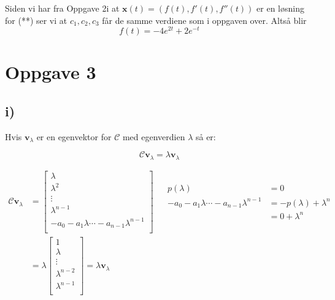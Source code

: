 \documentclass[a4paper, norsk, twoside, 10pt]{article}
\begin{document}
\begin{flushleft}
  Siden vi har fra Oppgave 2i at $\mathbf{x}(t)  = (f(t) , f'(t) , f''(t))$ er en løsning for (**) ser vi at $c_{1}, c_{2}, c_{3}$ får de samme verdiene som i oppgaven over. Altså blir
  \[f(t) = -4e^{2t} + 2e^{-t}\]



  \section*{Oppgave 3}

  \subsection*{i)}

  Hvis $\mathbf{v}_{\lambda}$ er en egenvektor for $\mathcal{C}$ med egenverdien $\lambda$ så er:

  \[\mathcal{C}\mathbf{v}_{\lambda} = \lambda \mathbf{v}_{\lambda}\]

  \begin{align*}
    \mathcal{C}\mathbf{v}_{\lambda} &=
    \begin{bmatrix}
      \lambda \\
      \lambda^{2} \\
      \vdots \\
      \lambda^{n-1} \\
      -a_{0} - a_{1}\lambda \cdots -a_{n-1}\lambda^{n-1}\\
    \end{bmatrix}
    &\begin{matrix}
       \begin{split}
         p(\lambda) &= 0\\
         -a_{0} - a_{1}\lambda \cdots -a_{n-1}\lambda^{n-1} &= -p(\lambda) + \lambda^{n} \\
         &= 0 +\lambda^{n}
       \end{split}
     \end{matrix} \\
    &= \lambda
    \begin{bmatrix}
      1 \\
      \lambda \\
      \vdots \\
      \lambda^{n-2} \\
      \lambda^{n-1} \\
    \end{bmatrix}
    = \lambda \mathbf{v}_{\lambda}
  \end{align*}


\end{flushleft}
\end{document}
